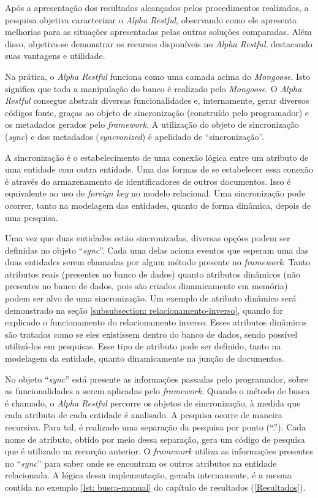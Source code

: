 Após a apresentação dos resultados alcançados pelos procedimentos realizados, a pesquisa objetiva caracterizar o \textit{Alpha Restful}, observando como ele apresenta melhorias para as situações apresentadas pelas outras soluções comparadas. Além disso, objetiva-se demonstrar os recursos disponíveis no \textit{Alpha Restful}, destacando suas vantagens e utilidade.

Na prática, o \textit{Alpha Restful} funciona como uma camada acima do \textit{Mongoose}. Isto significa que toda a manipulação do banco é realizado pelo \textit{Mongoose}. O \textit{Alpha Restful} consegue abstrair diversas funcionalidades e, internamente, gerar diversos códigos fonte, graças ao objeto de sincronização (construído pelo programador) e os metadados gerados pelo \textit{framework}. A utilização do objeto de sincronização (\textit{sync}) e dos metadados (\textit{syncronized}) é apelidado de ``sincronização''.

A sincronização é o estabelecimento de uma conexão lógica entre um atributo de uma entidade com outra entidade. Uma das formas de se estabelecer essa conexão é através do armazenamento de identificadores de outros documentos. Isso é equivalente ao uso de \textit{foreign key} no modelo relacional. Uma sincronização pode ocorrer, tanto na modelagem das entidades, quanto de forma dinâmica, depois de uma pesquisa.

Uma vez que duas entidades estão sincronizadas, diversas opções podem ser definidas no objeto ``\textit{sync}''. Cada uma delas aciona eventos que esperam uma das duas entidades serem chamadas por algum método presente no \textit{framework}. Tanto atributos reais (presentes no banco de dados) quanto atributos dinâmicos (não presentes no banco de dados, pois são criados dinamicamente em memória) podem ser alvo de uma sincronização. Um exemplo de atributo dinâmico será demonstrado na seção \ref{subsubsection: relacionamento-inverso}, quando for explicado o funcionamento do relacionamento inverso. Esses atributos dinâmicos são tratados como se eles existissem dentro do banco de dados, sendo possível utilizá-los em pesquisas. Esse tipo de atributo pode ser definido, tanto na modelagem da entidade, quanto dinamicamente na junção de documentos.

No objeto ``\textit{sync}'' está presente as informações passadas pelo programador, sobre as funcionalidades a serem aplicadas pelo \textit{framework}. Quando o método de busca é chamado, o \textit{Alpha Restful} percorre os objetos de sincronização, à medida que cada atributo de cada entidade é analisado. A pesquisa ocorre de maneira recursiva. Para tal, é realizado uma separação da pesquisa por ponto (``.''). Cada nome de atributo, obtido por meio dessa separação, gera um código de pesquisa que é utilizado na recurção anterior. O \textit{framework} utiliza as informações presentes no ``\textit{sync}'' para saber onde se encontram os outros atributos na entidade relacionada. A lógica dessa implementação, gerada internamente, é a mesma contida no exemplo \ref{lst: busca-manual} do capítulo de resultados (\ref{Resultados}).

